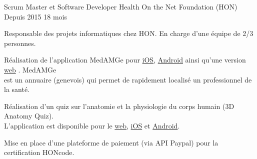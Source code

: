 
\begin{cventries}

  \cventry
    {Scrum Master et Software Developer}
    {Health On the Net Foundation (HON)}
    {Depuis 2015}
    {18 mois}
    {
      \begin{cvitems}
        \item{Responsable des projets informatiques chez HON. En charge d'une
          équipe de 2/3 personnes.
        }
        \item{Réalisation de l'application MedAMGe pour
          {\color{awesome-skyblue}
            \href{https://itunes.apple.com/us/app/medamge/id469762154?mt=8}{iOS}},
          {\color{awesome-skyblue}
            \href{https://play.google.com/store/apps/details?id=org.healthonnet.medamge.android&hl=en}{Android}}
          ainsi qu'une version
          {\color{awesome-skyblue}
            \href{https://www.medamge.ch}{web}}
          . MedAMGe \\est un annuaire (genevois) qui permet de rapidement localisé
          un professionnel de la santé.
        }
        \item{Réalisation d'un quiz sur l'anatomie et la physiologie du corps
          humain (3D Anatomy Quiz). \\L'application est disponible pour le
          {\color{awesome-skyblue}
            \href{https://3danatomyquiz.kaahe.org}{web}},
          {\color{awesome-skyblue}
            \href{https://itunes.apple.com/us/app/t-rf-ly-jsdk/id1020122013?mt=8}{iOS}}
          et
          {\color{awesome-skyblue}
            \href{https://play.google.com/store/apps/details?id=org.kaahe.anatomyQuiz&hl=en}{Android}}.
        }
        \item{Mise en place d'une plateforme de paiement (via API Paypal)
          pour la certification HONcode.
        }
      \end{cvitems}
    }


\end{cventries}
